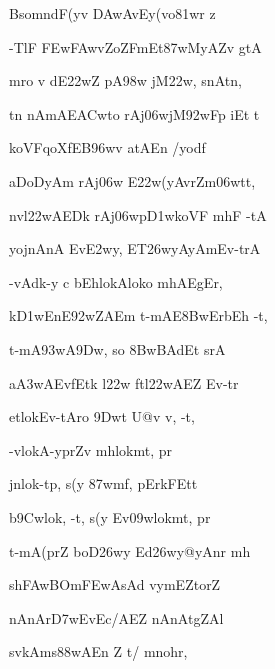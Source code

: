 {\dn BsomndF(y\?v\2 \3DAwAvEy(vo\381wr\2 z \dontdisplaylinenum}

{\dn -TlF \3FEw\3FAwvZoZFmEt\387wMyAZ\0v\2 gtA \vegdn\dontdisplaylinenum}

{\dn m\?ro v\4 dE\322wZ\? pA\398w\?{\qvb} jM\322w, snAtn,{\dandabdn} \dontdisplaylinenum}

{\dn t\?n nAmAE\3ACwto rAj\306wjM\392wFp iEt t \vegdn\dontdisplaylinenum}

{\dn koVFqoXfEB\396w\4v atAEn /yodf{\dandabdn} \dontdisplaylinenum}

{\dn aDoD\0yAm rAj\?\306w E\322w(yAvrZm\306wtt, \vegdn\dontdisplaylinenum}

{\dn nvl\322wAEDk\2 rAj\306wp\3D1wkoVF mhF -tA{\dandabdn} \dontdisplaylinenum}

{\dn yojnAnA\2  Ev\3E2w\?y, ET\326wyAyAmEv-trA \vegdn\dontdisplaylinenum}

{\dn -vAdk-y c bEhlo{\qvb}kAloko mhAEgEr,{\dandabdn} \dontdisplaylinenum}

{\dn k\3D1wEnE\392wZAEm t-mAE\38BwErbEh -t, \vegdn\dontdisplaylinenum}

{\dn t-mA\393wA\39Dw, so \38BwBA\0d\?Et srA \dontdisplaylinenum}

{\dn a\3A3wAEv\2fEtk\2 l\322w\2 ftl\322wAEZ Ev-tr \vegdn\dontdisplaylinenum}

{\dn etlo{\qvb}kEv-tAro \39Dwt U@v\0 v, -t,{\dandabdn} \dontdisplaylinenum}

{\dn -vlo{\qvb}kA-ypr\?Z\4v mhlo{\qvb}kmt, pr \vegdn\dontdisplaylinenum}

{\dn jnlok-tp, s(y\2 \387wmf, pErkFEt\0t \dontdisplaylinenum}

{\dn b\5\39Cwlok, -t, s(y\2 Ev\309wlokmt, pr \vegdn\dontdisplaylinenum}



{\dn t-mA(pr\?Z boD\326wy\2 Ed\326wy@yAnr\2 mh \dontdisplaylinenum}

{\dn sh\3FAwBOm\3FEwAsAd\2 v\4y\0mEZtorZ \vegdn\dontdisplaylinenum}

{\dn nAnAr\3D7wEvEc/AEZ nAnAtgZAl \dontdisplaylinenum}

{\dn sv\0kAms\388wAEn Z{\rdt} t/ mnohr\4, \vegdn\dontdisplaylinenum}

